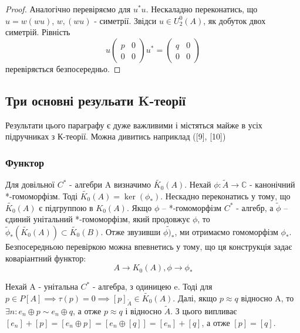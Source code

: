 \begin{lemma}
\begin{proof}
        Аналогічно перевіряємо для $u^* u$.
        Нескаладно переконатись, що $u = w (w u)$, $w, (w u)$ - симетрії.
        Звідси $u \in U^0_2(A)$, як добуток двох симетрій.
        Рівність
        \[
            u \begin{pmatrix}
                  p & 0 \\
                  0 & 0
            \end{pmatrix} u^* =
            \begin{pmatrix}
                q & 0 \\
                0 & 0
            \end{pmatrix}
        \]
        перевіряється безпосередньо.
    \end{proof}
\end{lemma}

\subsection{Три основні резульати K-теорії}\label{subsec:три-основні-резульати--k-теорії}
Результати цього параграфу є дуже важливими і містяться
майже в усіх підручниках з К-теорії. Можна дивитись наприклад ([9], [10])

\subsubsection{Функтор }
Для довільної $C^*$ - алгебри A визначимо $\widetilde{K_0}(A)$.
Нехай $\phi: \widetilde{A} \rightarrow \mathbb{C}$ - канонічний *-гомоморфізм.
Тоді $\widetilde{K_0}(A) = \ker(\phi_*)$.
Нескадно переконатись у тому, що $\widetilde{K_0}(A)$ є підгруппою в $K_0(A)$.
Якщо $\phi$ -- *-гомоморфізм $C^*$ - алгебр, а $\widetilde{\phi}$ -- єдиний унітальний *-гомоморфізм, який
продовжує $\phi$, то $\widetilde{\phi}_*(\widetilde{K_0}(A)) \subset \widetilde{K_0}(B)$.
Отже звузивши $\widetilde{\phi)_*}$, ми отримаємо гомоморфізм $\phi_*$.
Безпосередньою перевіркою можна впевнетись у тому, що ця конструкція задає коваріантний функтор:
\begin{equation*}
    A \rightarrow K_0(A), \phi \rightarrow \phi_*
\end{equation*}

Нехай A - унітальна $C^*$ - алгебра, з одиницею e.
Тоді для $p \in P[A] \implies \tau(p) = 0 \implies [p]_{\widetilde{A}} \in \widetilde{K_0}(A)$.
Далі, якщо $p \approx q$ відносно A, то $\exists n: e_n \oplus p \sim e_n \oplus q$, а отже $p \approx q$ і відносно
$\widetilde{A}$.
З цього випливає $[e_n] + [p] = [e_n \oplus p] = [e_n \oplus [q]] = [e_n] + [q]$, а отже $[p] = [q]$.

